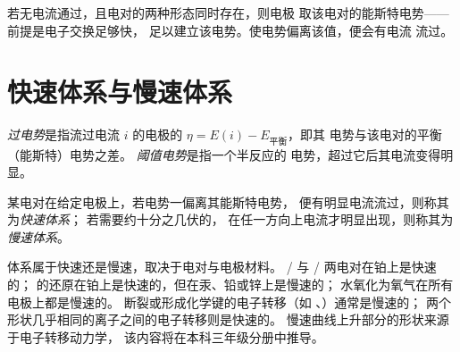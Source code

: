 若无电流通过，且电对的两种形态同时存在，则电极
取该电对的能斯特电势——前提是电子交换足够快，
足以建立该电势。使电势偏离该值，便会有电流
流过。

\section{快速体系与慢速体系}

\begin{definition}[过电势]\label{def:b2:current-potential-curves:overpotential}
\emph{过电势}是指流过电流
$i$ 的电极的 $\eta = E(i) - E_{\text{平衡}}$，即其
电势与该电对的平衡（能斯特）电势之差。
\emph{阈值电势}是指一个半反应的
电势，超过它后其电流变得明显。
\end{definition}

\begin{definition}[快速体系与慢速体系]\label{def:b2:current-potential-curves:fast-slow}
某电对在给定电极上，若电势一偏离其能斯特电势，
便有明显电流流过，则称其为\emph{快速体系}；
若需要约十分之几伏的，
在任一方向上电流才明显出现，则称其为
\emph{慢速体系}。
\end{definition}

体系属于快速还是慢速，取决于电对与电极材料。
/ 与 / 两电对在铂上是快速的；
 的还原在铂上是快速的，但在汞、铅或锌上是慢速的；
水氧化为氧气在所有电极上都是慢速的。
断裂或形成化学键的电子转移（如 、）通常是慢速的；
两个形状几乎相同的离子之间的电子转移则是快速的。
慢速曲线上升部分的形状来源于电子转移动力学，
该内容将在本科三年级分册中推导。

